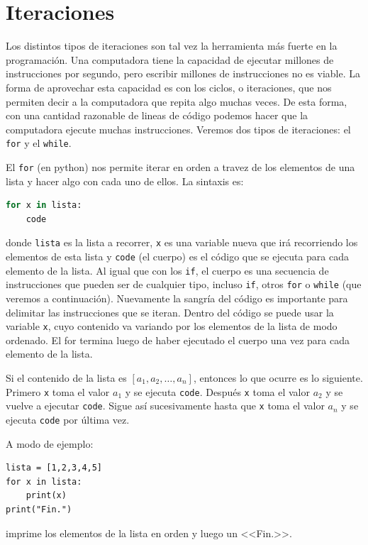 \documentclass[a4paper, 12pt]{report}
\theoremstyle{definition}
\begin{document}
\section{Iteraciones}

Los distintos tipos de iteraciones son tal vez la herramienta más fuerte en la programación. Una computadora tiene la capacidad de ejecutar millones de instrucciones por segundo, pero escribir millones de instrucciones no es viable. La forma de aprovechar esta capacidad es con los ciclos, o iteraciones, que nos permiten decir a la computadora que repita algo muchas veces. De esta forma, con una cantidad razonable de lineas de código podemos hacer que la computadora ejecute muchas instrucciones. Veremos dos tipos de iteraciones: el {\tt for} y el {\tt while}.

El {\tt for} (en python) nos permite iterar en orden a travez de los elementos de una lista y hacer algo con cada uno de ellos. La sintaxis es:
\begin{lstlisting}[language=python]
for x in lista:
    code
\end{lstlisting}
donde {\tt lista} es la lista a recorrer, {\tt x} es una variable nueva que irá recorriendo los elementos de esta lista y {\tt code} (el cuerpo) es el código que se ejecuta para cada elemento de la lista. Al igual que con los {\tt if}, el cuerpo es una secuencia de instrucciones que pueden ser de cualquier tipo, incluso {\tt if}, otros {\tt for} o {\tt while} (que veremos a continuación). Nuevamente la sangría del código es importante para delimitar las instrucciones que se iteran. Dentro del código se puede usar la variable {\tt x}, cuyo contenido va variando por los elementos de la lista de modo ordenado. El for termina luego de haber ejecutado el cuerpo una vez para cada elemento de la lista.

Si el contenido de la lista es $[a_1,a_2,\dots,a_n]$, entonces lo que ocurre es lo siguiente. Primero {\tt x} toma el valor $a_1$ y se ejecuta {\tt code}. Después {\tt x} toma el valor $a_2$ y se vuelve a ejecutar {\tt code}. Sigue así sucesivamente hasta que {\tt x} toma el valor $a_n$ y se ejecuta {\tt code} por última vez.

A modo de ejemplo:
\begin{verbatim}
lista = [1,2,3,4,5]
for x in lista:
    print(x)
print("Fin.")
\end{verbatim}
imprime los elementos de la lista en orden y luego un <<Fin.>>.
\end{document}
